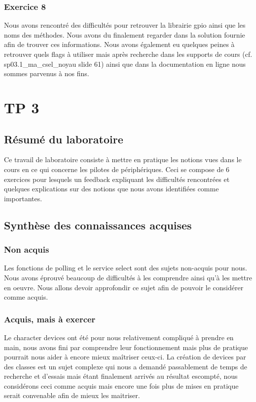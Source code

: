 \documentclass{ReportTemplate}
\begin{document}
\subsection{Exercice 8}
Nous avons rencontré des difficultés pour retrouver la librairie gpio ainsi que
les noms des méthodes. Nous avons du finalement regarder dans la solution
fournie afin de trouver ces informations. Nous avons également eu quelques
peines à retrouver quels flags à utiliser mais après recherche dans les supports
de cours (cf. sp03.1\_ma\_csel\_noyau slide 61) ainsi que dans la documentation
en ligne nous sommes parvenus à nos fins.

\chapter{TP 3}
\section{Résumé du laboratoire}
Ce travail de laboratoire consiste à mettre en pratique les notions vues dans le
cours en ce qui concerne les pilotes de périphériques. Ceci se compose de 6
exercices pour lesquels un feedback expliquant les difficultés rencontrées et
quelques explications sur des notions que nous avons identifiées comme importantes.
\section{Synthèse des connaissances acquises}
\subsection{Non acquis}
Les fonctions de polling et le service select sont des sujets non-acquis pour
nous. Nous avons éprouvé beaucoup de difficultés à les comprendre ainsi qu'à les
mettre en oeuvre. Nous allons devoir approfondir ce sujet afin de pouvoir le
considérer comme acquis.
\subsection{Acquis, mais à exercer}
Le character devices ont été pour nous relativement compliqué à prendre en main,
nous avons fini par comprendre leur fonctionnement mais plus de pratique
pourrait nous aider à encore mieux maîtriser ceux-ci.\newline
La création de devices par des classes est un sujet complexe qui nous a demandé
passablement de temps de recherche et d'essais mais étant finalement arrivés au
résultat escompté, nous considérons ceci comme acquis mais encore une fois plus
de mises en pratique serait convenable afin de mieux les maitriser.
\end{document}
